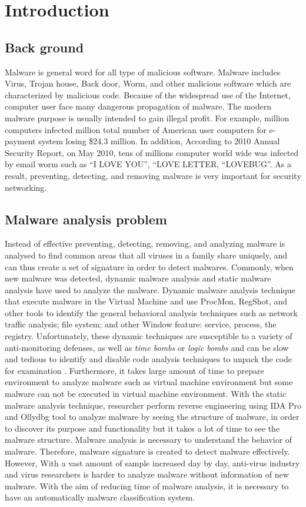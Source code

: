 \chapter{Introduction}\label{chap:1}

%
%
\section{Back ground}Malware is general word for all type of malicious software. Malware includes Virus, Trojan house, Back door, Worm, and other malicious software which are characterized by malicious code.
Because of the widespread use of the Internet, computer user face many dangerous propagation of malware. The modern malware purpose is usually intended to gain illegal profit. For example, million computers infected million total number of American user computers for e-payment system losing \$$24.3$ million\cite{keylogger}. In addition, According to 2010 Annual Security Report, on May 2010, tens of millions computer world wide was infected by email worm such as “I LOVE YOU”, “LOVE LETTER, “LOVEBUG”\cite{Symantec}. As a result, preventing, detecting, and removing malware is very important for security networking.
\section{Malware analysis problem}
Instead of effective preventing, detecting, removing, and analyzing malware is analysed to find common areas that all viruses in a family share uniquely, and can thus create a set of signature in order to detect malwares.
Commonly, when new malware was detected, dynamic malware analysis and static malware analysis have used to analyze the malware. Dynamic malware analysis technique that execute malware in the Virtual Machine and use ProcMon, RegShot, and other tools to identify the general behavioral analysis techniques such as network traffic analysis; file system; and other Window feature: service, process, the registry.
Unfortunately, these dynamic techniques are susceptible to a variety of anti-monitoring defenses, as well as \emph{time bombs} or \emph{logic bombs} and can be slow and tedious to identify and disable code analysis techniques to unpack the code for examination \cite{georg}. Furthermore, it takes large amount of time to prepare environment to analyze malware such as virtual machine environment but some malware can not be executed in virtual machine environment.
With the static malware analysis technique, researcher perform reverse engineering using IDA Pro and Ollydbg tool to analyze malware by seeing the structure of malware, in order to discover its purpose and functionality but it takes a lot of time to see the malware structure. 
Malware analysis is necessary to understand the behavior of malware. Therefore, malware signature is created to detect malware effectively. However,
With a vast amount of sample increased day by day, anti-virus industry and virus researchers is harder to analyze malware without information of new malware. With the aim of reducing time of malware analysis, it is necessary to have an automatically malware classification system.


